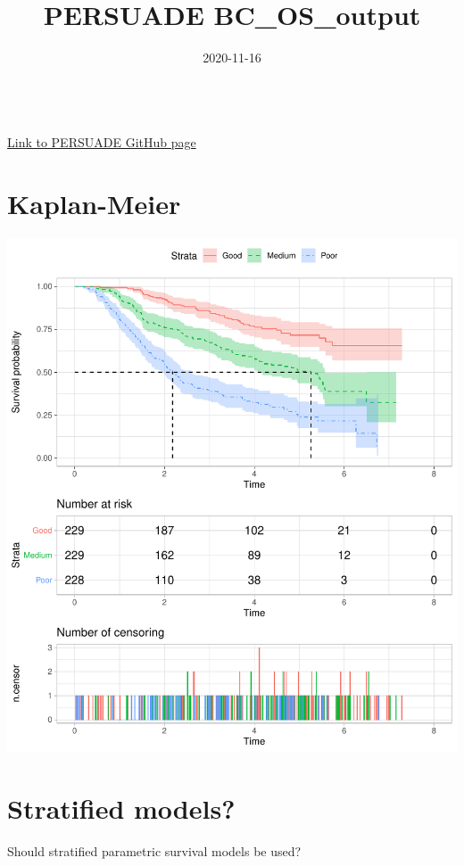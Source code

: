 \documentclass[]{article}
\title{PERSUADE BC\_OS\_output}
\author{}
\date{\vspace{-2.5em}2020-11-16}
\begin{document}
\maketitle

{
\hypersetup{linkcolor=black}
\setcounter{tocdepth}{2}
\tableofcontents
}
~\\
\href{https://github.com/Bram-R/PERSUADE}{Link to PERSUADE GitHub page}
\newpage

\section{Kaplan-Meier}\label{kaplan-meier}

\begin{flushleft}\includegraphics{images/plot_KM-1} \end{flushleft}

\newpage

\section{Stratified models?}\label{stratified-models}

Should stratified parametric survival models be used?
\end{document}
